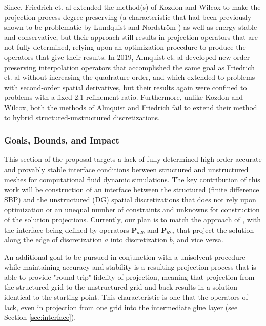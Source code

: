 Since, Friedrich et. al \cite{friedrich2018conservative} extended the
method(s) of Kozdon and Wilcox to make the
projection process degree-preserving (a characteristic that had been
previously shown to be problematic by Lundquist and Nordstr{\"o}m \cite{lundquist2016suboptimal}) as well as
energy-stable and conservative, but their approach still results in projection
operators that are not fully determined, relying upon an optimization procedure
to produce the operators that give their results. In 2019, Almquist et. al \cite{almquist2019order} developed new order-preserving interpolation operators that accomplished
the same goal as Friedrich et. al without increasing the quadrature order, and which
extended to problems with second-order spatial derivatives, but their results again
were confined to problems with a fixed 2:1 refinement ratio. Furthermore, unlike Kozdon
and Wilcox, both the methods of Almquist and Friedrich fail to extend their method to hybrid structured-unstructured discretizations.

\subsubsection{Goals, Bounds, and Impact} \label{sec:hybrid_goals}

This section of the proposal targets a lack of fully-determined high-order
accurate and provably stable interface conditions between structured and unstructured
meshes for computational fluid dynamic simulations. The key contribution of this work
will be construction of an interface between the structured (finite difference SBP)
and the unstructured (DG) spatial discretizations that does not rely upon
optimization or an unequal number of constraints and unknowns for construction
of the solution projections. Currently, our plan is to match the approach of
\cite{kozdon2016stable}, with the interface being defined by operators $\pmb{P}_{a2b}$
and $\pmb{P}_{b2a}$ that project the solution along the edge of discretization $a$
into discretization $b$, and vice versa.

An additional goal to be pursued in conjunction with a unisolvent procedure while
maintaining accuracy and stability is a resulting projection process that is able to
provide "round-trip" fidelity of projection, meaning that projection from the structured
grid to the unstructured grid and back results in a solution identical to the starting
point. This characteristic is one that the operators of \cite{kozdon2016stable} lack,
even in projection from one grid into the intermediate glue layer (see Section \ref{sec:interface}).

